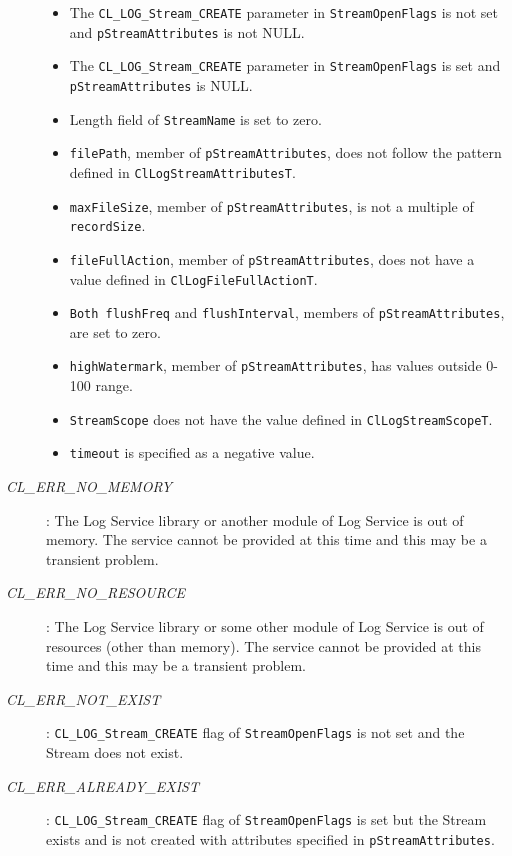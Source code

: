 \begin{flushleft}
\begin{Desc}
\begin{description}
		\begin{itemize}
		\item
		The {\tt{CL\_\-LOG\_\-Stream\_\-CREATE}} parameter in {\tt{StreamOpenFlags}} is not set and {\tt{pStreamAttributes}} is not NULL.
		\item
		The {\tt{CL\_\-LOG\_\-Stream\_\-CREATE}} parameter in {\tt{StreamOpenFlags}} is set and {\tt{pStreamAttributes}} is NULL.
		\item
		Length field of {\tt{StreamName}} is set to zero.
		\item
		{\tt{filePath}}, member of {\tt{pStreamAttributes}}, does not follow the pattern defined in {\tt{ClLogStreamAttributesT}}.
		\item
		{\tt{maxFileSize}}, member of {\tt{pStreamAttributes}}, is not a multiple of {\tt{recordSize}}.
		\item
		{\tt{fileFullAction}}, member of {\tt{pStreamAttributes}}, does not have a value defined in {\tt{ClLogFileFullActionT}}.
		\item
		{\tt{Both flushFreq}} and {\tt{flushInterval}}, members of {\tt{pStreamAttributes}}, are set to zero.
		\item
		{\tt{highWatermark}}, member of {\tt{pStreamAttributes}}, has values outside 0-100 range.
		\item
		{\tt{StreamScope}} does not have the value defined in {\tt{ClLogStreamScopeT}}.
		\item
		{\tt{timeout}} is specified as a negative value.
		\end{itemize}

\item[{\em CL\_\-ERR\_\-NO\_\-MEMORY}]: The Log Service library or another module of Log Service is out of memory. The service cannot 
be provided at this time and this may be a transient problem.

\item[{\em CL\_\-ERR\_\-NO\_\-RESOURCE}]: The Log Service library or some other module of Log Service is out of resources 
(other than memory). The service cannot be provided at this time and this may be a transient problem.

\item[{\em CL\_\-ERR\_\-NOT\_\-EXIST}]: {\tt{CL\_\-LOG\_\-Stream\_\-CREATE}} flag of {\tt{StreamOpenFlags}} is not set and the Stream does not exist.

\item[{\em CL\_\-ERR\_\-ALREADY\_\-EXIST}]: {\tt{CL\_\-LOG\_\-Stream\_\-CREATE}} flag of {\tt{StreamOpenFlags}} is set but the Stream exists
and is not created with attributes specified in {\tt{pStreamAttributes}}.


\end{description}
\end{Desc}
\end{flushleft}
